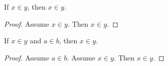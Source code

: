 \begin{proposition}\label{assumetest}
    If $x\in y$, then $x\in y$.
\end{proposition}
\begin{proof}
    Assume $x\in y$.
    Then $x\in y$.
\end{proof}

\begin{proposition}\label{assumetesttwo}
    If $x\in y$ and $a\in b$, then $x\in y$.
\end{proposition}
\begin{proof}
    Assume $a\in b$.
    Assume $x\in y$.
    Then $x\in y$.
\end{proof}
